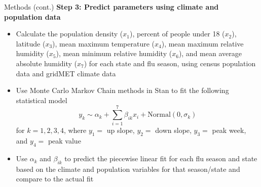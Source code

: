 
\begin{block}{Methods (cont.)}
\textbf{Step 3: Predict parameters using climate and population data}
\begin{itemize}
	\item Calculate the population density ($x_1$), percent of people under 18 ($x_2$), latitude ($x_3$), mean maximum temperature ($x_4$), mean maximum relative humidity ($x_5$), mean minimum relative humidity ($x_6$), and mean average absolute humidity ($x_7$) for each state and flu season, using census population data and gridMET climate data 
	\item Use Monte Carlo Markov Chain methods in Stan to fit the following statistical model $$y_k \sim \alpha_k + \sum_{i=1}^7 \beta_{ik}x_i + \text{Normal}(0, \sigma_k)$$ for $k = 1,2,3,4$, where $y_1=$ up slope, $y_2=$ down slope, $y_3=$ peak week, and $y_4=$ peak value
	\item Use $\alpha_k$ and $\beta_{ik}$ to predict the piecewise linear fit for each flu season and state based on the climate and population variables for that season/state and compare to the actual fit
\end{itemize}	

\end{block}

\vspace{\coltwosep}

